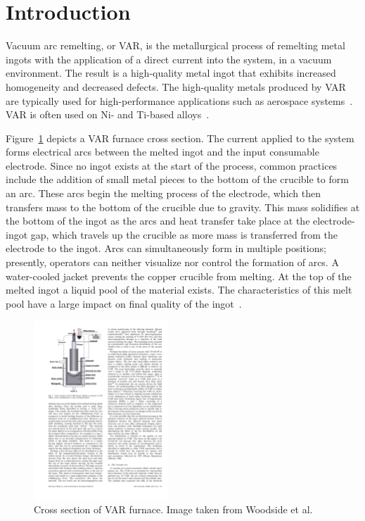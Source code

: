 \documentclass[onehalf,11pt]{beavtex}
\begin{document}
\section{Introduction}

Vacuum arc remelting, or VAR, is the metallurgical process of remelting metal ingots with the application of a direct current into the system, in a vacuum environment.
The result is a high-quality metal ingot that exhibits increased homogeneity and decreased defects.
The high-quality metals produced by VAR are typically used for high-performance applications such as aerospace systems~\cite{Yu:2002}.
VAR is often used on Ni- and Ti-based alloys~\cite{Woodside:2013cf,Pericleous:2013kb,Zhao:2011es,Yang:2010kq}. 

Figure~\ref{fig:vardiagram} depicts a VAR furnace cross section.
The current applied to the system forms electrical arcs between the melted ingot and the input consumable electrode. 
Since no ingot exists at the start of the process, common practices include the addition of small metal pieces to the bottom of the crucible to form an arc.
These arcs begin the melting process of the electrode, which then transfers mass to the bottom of the crucible due to gravity. 
This mass solidifies at the bottom of the ingot as the arcs and heat transfer take place at the electrode-ingot gap, which travels up the crucible as more mass is transferred from the electrode to the ingot. 
Arcs can simultaneously form in multiple positions; presently, operators can neither visualize nor control the formation of arcs.
A water-cooled jacket prevents the copper crucible from melting.
At the top of the melted ingot a liquid pool of the material exists. 
The characteristics of this melt pool have a large impact on final quality of the ingot~\cite{Zhao:2011es,Yang:2010kq,Beaman:2014fi}.

\begin{figure}[htbp]
\centering
\includegraphics[width=0.45\textwidth]{furnace.pdf}
\caption{Cross section of VAR furnace. Image taken from Woodside et al.~\cite{Woodside:2013cf}}
\label{fig:vardiagram}
\end{figure}
\end{document}
